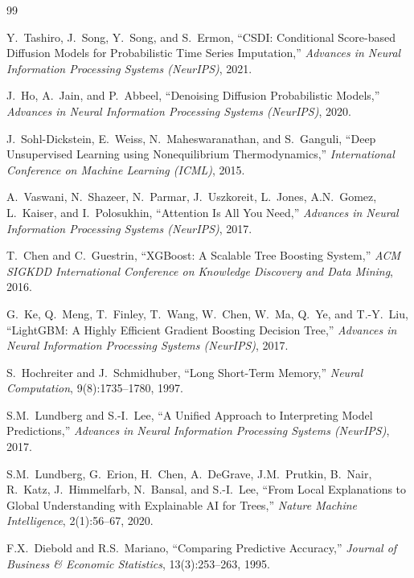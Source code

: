 \documentclass[12pt,a4paper]{article}
\begin{document}
\newpage
\begin{thebibliography}{99}

Y.~Tashiro, J.~Song, Y.~Song, and S.~Ermon,
``CSDI: Conditional Score-based Diffusion Models for Probabilistic Time Series Imputation,''
\textit{Advances in Neural Information Processing Systems (NeurIPS)}, 2021.

J.~Ho, A.~Jain, and P.~Abbeel,
``Denoising Diffusion Probabilistic Models,''
\textit{Advances in Neural Information Processing Systems (NeurIPS)}, 2020.

J.~Sohl-Dickstein, E.~Weiss, N.~Maheswaranathan, and S.~Ganguli,
``Deep Unsupervised Learning using Nonequilibrium Thermodynamics,''
\textit{International Conference on Machine Learning (ICML)}, 2015.

A.~Vaswani, N.~Shazeer, N.~Parmar, J.~Uszkoreit, L.~Jones, A.N.~Gomez, L.~Kaiser, and I.~Polosukhin,
``Attention Is All You Need,''
\textit{Advances in Neural Information Processing Systems (NeurIPS)}, 2017.

T.~Chen and C.~Guestrin,
``XGBoost: A Scalable Tree Boosting System,''
\textit{ACM SIGKDD International Conference on Knowledge Discovery and Data Mining}, 2016.

G.~Ke, Q.~Meng, T.~Finley, T.~Wang, W.~Chen, W.~Ma, Q.~Ye, and T.-Y.~Liu,
``LightGBM: A Highly Efficient Gradient Boosting Decision Tree,''
\textit{Advances in Neural Information Processing Systems (NeurIPS)}, 2017.

S.~Hochreiter and J.~Schmidhuber,
``Long Short-Term Memory,''
\textit{Neural Computation}, 9(8):1735--1780, 1997.

S.M.~Lundberg and S.-I.~Lee,
``A Unified Approach to Interpreting Model Predictions,''
\textit{Advances in Neural Information Processing Systems (NeurIPS)}, 2017.

S.M.~Lundberg, G.~Erion, H.~Chen, A.~DeGrave, J.M.~Prutkin, B.~Nair, R.~Katz, J.~Himmelfarb, N.~Bansal, and S.-I.~Lee,
``From Local Explanations to Global Understanding with Explainable AI for Trees,''
\textit{Nature Machine Intelligence}, 2(1):56--67, 2020.

F.X.~Diebold and R.S.~Mariano,
``Comparing Predictive Accuracy,''
\textit{Journal of Business \& Economic Statistics}, 13(3):253--263, 1995.


\end{thebibliography}
\end{document}
